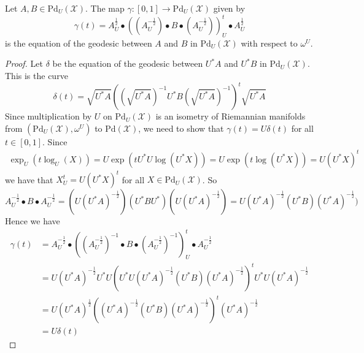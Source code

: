 \documentclass[10pt,a4paper]{amsart}
\begin{document}
\begin{theorem}
    Let $A,B\in \mathrm{Pd}_U(\mathcal{X})$. The map $\gamma:[0,1]\to \mathrm{Pd}_U(\mathcal{X})$ given by 
    \begin{equation*}\gamma(t)=A_U^{\frac{1}{2}}\bullet ((A_U^{-\frac{1}{2}})\bullet B\bullet (A_U^{-\frac{1}{2}}))_U^t\bullet A_U^{\frac{1}{2}}\end{equation*} is the equation of the geodesic between $A$ and $B$ in $\mathrm{Pd}_U(\mathcal{X})$ with respect to $\omega^U$. 
\end{theorem}

\begin{proof}
    Let $\delta$ be the equation of the geodesic between $U^*A$ and $U^*B$ in $\mathrm{Pd}_{U}(\mathcal{X})$. This is the curve 
    \begin{equation*}\delta(t)=\sqrt{U^*A}((\sqrt{U^*A})^{-1}U^*B(\sqrt{U^*A})^{-1})^t\sqrt{U^*A}\end{equation*}
    Since multiplication by $U$ on $\mathrm{Pd}_{U}(\mathcal{X})$ is an isometry of Riemannian manifolds from $(\mathrm{Pd}_{U}(\mathcal{X}),\omega^U)$ to $\mathrm{Pd}(\mathcal{X})$, we need to show that $\gamma(t)=U\delta(t)$ for all $t\in [0,1]$. Since 
    \begin{align*}
        \exp_U(t\log_U(X))=U\exp(tU^*U\log(U^*X))=U\exp(t\log(U^*X))=U(U^*X)^t
    \end{align*}
    we have that $X_U^t=U(U^*X)^t$ for all $X\in \mathrm{Pd}_U(\mathcal{X})$. So
    \begin{equation*}{A_U^{-\frac{1}{2}}}\bullet B\bullet {A_U^{-\frac{1}{2}}}=(U(U^*A)^{-\frac{1}{2}})(U^*BU^*)(U(U^*A)^{-\frac{1}{2}})=U(U^*A)^{-\frac{1}{2}}(U^*B)(U^*A)^{-\frac{1}{2}})\end{equation*}
    Hence we have 
    \begin{align*}
        \gamma(t)&=A_U^{-\frac{1}{2}}\bullet ((A_U^{-\frac{1}{2}})^{-1}\bullet B\bullet (A_U^{-\frac{1}{2}})^{-1})_U^t\bullet A_U^{-\frac{1}{2}}\\
        &=U(U^*A)^{-\frac{1}{2}}U^*U(U^*U(U^*A)^{-\frac{1}{2}}(U^*B)(U^*A)^{-\frac{1}{2}})^{t}U^*U(U^*A)^{-\frac{1}{2}}\\
        &=U(U^*A)^{\frac{1}{2}}((U^*A)^{-\frac{1}{2}}(U^*B)(U^*A)^{-\frac{1}{2}})^{t}(U^*A)^{-\frac{1}{2}}\\
        &=U\delta(t)
    \end{align*}
\end{proof}
\end{document}
